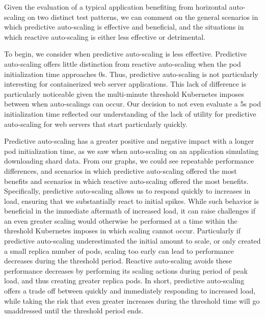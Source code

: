 Given the evaluation of a typical application benefiting from horizontal
auto-scaling on two distinct test patterns, we can comment on the general
scenarios in which predictive auto-scaling is effective and beneficial, and the
situations in which reactive auto-scaling is either less effective or
detrimental.

To begin, we consider when predictive auto-scaling is less
effective. Predictive auto-scaling offers little distinction from reactive
auto-scaling when the pod initialization time approaches 0s. Thus, predictive
auto-scaling is not particularly interesting for containerized web server
applications. This lack of difference is particularly noticeable given the
multi-minute threshold Kubernetes imposes between when auto-scalings can occur.
Our decision to not even evaluate a 5s pod initialization time reflected our
understanding of the lack of utility for predictive auto-scaling for web servers
that start particularly quickly.

Predictive auto-scaling has a greater positive and negative impact
with a longer pod initialization time, as we saw when auto-scaling on an
application simulating downloading shard data. From our graphs, we could see
repeatable performance differences, and scenarios in which predictive
auto-scaling offered the most benefits and scenarios in which reactive
auto-scaling offered the most benefits. Specifically, predictive auto-scaling
allows us to respond quickly to increases in load, ensuring that we
substantially react to initial spikes. While such behavior is beneficial in the
immediate aftermath of increased load, it can raise challenges if an even
greater scaling would otherwise be performed at a time within the
threshold Kubernetes imposes in
which scaling cannot occur. Particularly if predictive auto-scaling
underestimated the initial amount to scale, or only created a small replica
number of pods, scaling too early can lead to
performance decreases during the threshold period. Reactive auto-scaling avoids
these performance decreases by performing its scaling actions during period of
peak load, and thus creating greater replica pods. In short, predictive
auto-scaling offers a trade off between quickly and immediately responding to
increased load, while taking the risk that even greater increases during the
threshold time will go unaddressed until the threshold period ends.


